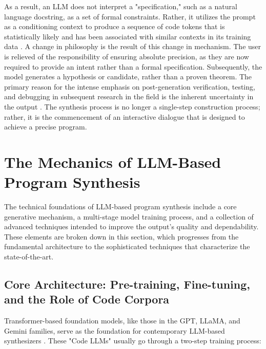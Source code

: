\documentclass[12pt, a4paper]{report}
\begin{document}
 As a result, an LLM does not interpret a "specification," such as a natural language docstring, as a set of formal constraints.  Rather, it utilizes the prompt as a conditioning context to produce a sequence of code tokens that is statistically likely and has been associated with similar contexts in its training data \citep{brown2020language}.  A change in philosophy is the result of this change in mechanism.  The user is relieved of the responsibility of ensuring absolute precision, as they are now required to provide an intent rather than a formal specification.  Subsequently, the model generates a hypothesis or candidate, rather than a proven theorem.  The primary reason for the intense emphasis on post-generation verification, testing, and debugging in subsequent research in the field is the inherent uncertainty in the output \citep{shinn2023reflexion}.  The synthesis process is no longer a single-step construction process; rather, it is the commencement of an interactive dialogue that is designed to achieve a precise program.

\section{The Mechanics of LLM-Based Program Synthesis}

The technical foundations of LLM-based program synthesis include a core generative mechanism, a multi-stage model training process, and a collection of advanced techniques intended to improve the output's quality and dependability. These elements are broken down in this section, which progresses from the fundamental architecture to the sophisticated techniques that characterize the state-of-the-art.

\subsection{Core Architecture: Pre-training, Fine-tuning, and the Role of Code Corpora}

Transformer-based foundation models, like those in the GPT, LLaMA, and Gemini families, serve as the foundation for contemporary LLM-based synthesizers \citep{zhao2023survey}. These "Code LLMs" usually go through a two-step training process:
\end{document}
